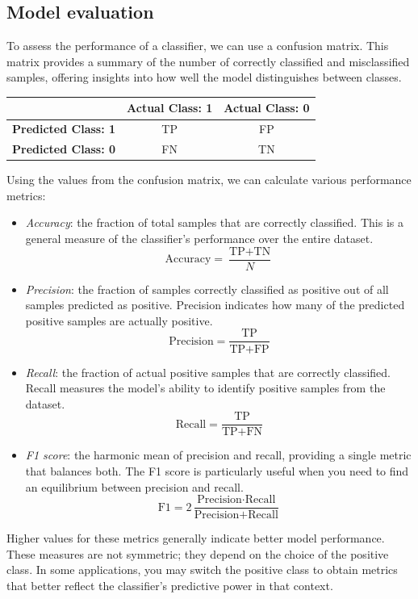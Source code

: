\subsection{Model evaluation}
To assess the performance of a classifier, we can use a confusion matrix. 
This matrix provides a summary of the number of correctly classified and misclassified samples, offering insights into how well the model distinguishes between classes.
\begin{table}[h!]
    \centering
    \begin{tabular}{|c|c|c|}
        \hline
        & \textbf{Actual Class: 1} & \textbf{Actual Class: 0} \\ \hline
        \textbf{Predicted Class: 1} & TP & FP \\ \hline
        \textbf{Predicted Class: 0} & FN & TN \\ \hline
    \end{tabular}
\end{table}
Using the values from the confusion matrix, we can calculate various performance metrics:
\begin{itemize}
    \item \textit{Accuracy}: the fraction of total samples that are correctly classified. 
        This is a general measure of the classifier's performance over the entire dataset. 
        \[\text{Accuracy}=\dfrac{\text{TP}+\text{TN}}{N}\]
    \item \textit{Precision}: the fraction of samples correctly classified as positive out of all samples predicted as positive. 
        Precision indicates how many of the predicted positive samples are actually positive.
        \[\text{Precision}=\dfrac{\text{TP}}{\text{TP}+\text{FP}}\]
    \item \textit{Recall}: the fraction of actual positive samples that are correctly classified. 
        Recall measures the model's ability to identify positive samples from the dataset.
        \[\text{Recall}=\dfrac{\text{TP}}{\text{TP}+\text{FN}}\]
    \item \textit{F1 score}: the harmonic mean of precision and recall, providing a single metric that balances both. 
        The F1 score is particularly useful when you need to find an equilibrium between precision and recall.
         \[\text{F1}=2\dfrac{\text{Precision}\cdot\text{Recall}}{\text{Precision}+\text{Recall}}\]
\end{itemize}
Higher values for these metrics generally indicate better model performance.
These measures are not symmetric; they depend on the choice of the positive class. 
In some applications, you may switch the positive class to obtain metrics that better reflect the classifier's predictive power in that context.